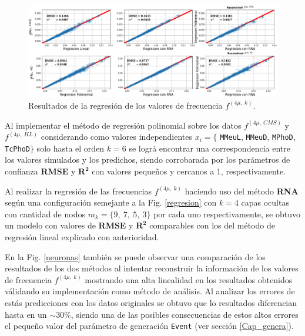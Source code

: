 \begin{figure}[!ht]
\centering
\includegraphics[width=1\textwidth]{Simulacion/imagenes/ML_Entries.png}
\caption{Resultados de la regresión de los valores de frecuencia $f^{(4\mu,~k)}$.}
\label{regresionALL}
\end{figure}


Al implementar el método de regresión polinomial sobre los datos $f^{(4\mu,~CMS)}$ y $f^{(4\mu,~HL)}$ considerando como valores independientes $x_i=\{$ \texttt{MMeuL}, \texttt{MMeuD}, \texttt{MPhoD}, \texttt{TcPhoD}$\}$ solo hasta el orden $k = 6$ se lográ encontrar una correspondencia entre los valores simulados y los predichos, siendo corrobarada por los parámetros de confianza \textbf{RMSE} y $\mathbf{R^2}$ con valores pequeños y cercanos a 1, respectivamente. 

Al realizar la regresión de las frecuencias $f^{(4\mu,~k)}$ haciendo uso del método \textbf{RNA} según una configuración semejante a la Fig. \ref{regresion} con $k=4$ capas ocultas con cantidad de nodos $m_k=\{9,~7,~5,~3\}$ por cada uno respectivamente, se obtuvo un modelo con valores de \textbf{RMSE} y $\mathbf{R^2}$ comparables con los del método de regresión lineal explicado con anterioridad.

En la Fig. \ref{neuronas} también se puede observar una comparación de los resultados de los dos métodos al intentar reconstruir la información de los valores de frecuencia $f^{(4\mu,~k)}$ mostrando una alta linealidad en los resultados obtenidos válidando su implementación como método de análisis. Al analizar los errores de estás predicciones con los datos originales se obtuvo que lo resultados diferencian hasta en un $\sim 30\%$, siendo una de las posibles consecuencias de estos altos errores el pequeño valor del parámetro de generación \texttt{Event} (ver sección \ref{Cap_genera}).

%








